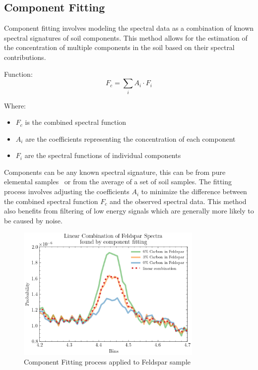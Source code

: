 \documentclass[review]{elsarticle}
\begin{document}
\subsection{Component Fitting}

Component fitting involves modeling the spectral data as a combination of known spectral signatures of soil components. This method allows for the estimation of the concentration of multiple components in the soil based on their spectral contributions.

Function: 
\begin{equation}
F_c = \sum_i A_i \cdot F_i
\end{equation}

Where:
\begin{itemize}
\item $F_c$ is the combined spectral function
\item $A_i$ are the coefficients representing the concentration of each component
\item $F_i$ are the spectral functions of individual components
\end{itemize}

Components can be any known spectral signature, this can be from pure elemental samples~\cite{kavetskiy_neutron_2023} or from the average of a set of soil samples. The fitting process involves adjusting the coefficients $A_i$ to minimize the difference between the combined spectral function $F_c$ and the observed spectral data. This method also benefits from filtering of low energy signals which are generally more likely to be caused by noise.

\begin{figure}[H]
\centering
\includegraphics[width=0.8\textwidth]{../Figures/Analysis/linear_combination_feldspar.png}
\caption{Component Fitting process applied to Feldspar sample}
\label{fig:component_fitting}
\end{figure}
\end{document}
